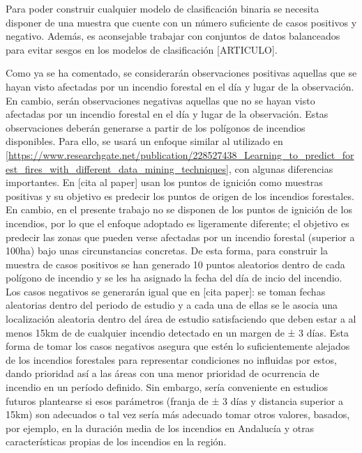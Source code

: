 \documentclass[12pt,a4paper,]{book}
\numberwithin{dummy}{section}
\theoremstyle{ocrenumbox}
\theoremstyle{blacknumex}
\theoremstyle{blacknumbox}
\theoremstyle{ocrenum}
\theoremstyle{ocrenum}
\begin{document}
Para poder construir cualquier modelo de clasificación binaria se
necesita disponer de una muestra que cuente con un número suficiente de
casos positivos y negativo. Además, es aconsejable trabajar con
conjuntos de datos balanceados para evitar sesgos en los modelos de
clasificación {[}ARTICULO{]}.

Como ya se ha comentado, se considerarán observaciones positivas
aquellas que se hayan visto afectadas por un incendio forestal en el día
y lugar de la observación. En cambio, serán observaciones negativas
aquellas que no se hayan visto afectadas por un incendio forestal en el
día y lugar de la observación. Estas observaciones deberán generarse a
partir de los polígonos de incendios disponibles. Para ello, se usará un
enfoque similar al utilizado en
{[}\url{https://www.researchgate.net/publication/228527438_Learning_to_predict_forest_fires_with_different_data_mining_techniques}{]},
con algunas diferencias importantes. En {[}cita al paper{]} usan los
puntos de ignición como muestras positivas y su objetivo es predecir los
puntos de origen de los incendios forestales. En cambio, en el presente
trabajo no se disponen de los puntos de ignición de los incendios, por
lo que el enfoque adoptado es ligeramente diferente; el objetivo es
predecir las zonas que pueden verse afectadas por un incendio forestal
(superior a 100ha) bajo unas circunstancias concretas. De esta forma,
para construir la muestra de casos positivos se han generado 10 puntos
aleatorios dentro de cada polígono de incendio y se les ha asignado la
fecha del día de incio del incendio. Los casos negativos se generarán
igual que en {[}cita paper{]}: se toman fechas aleatorias dentro del
periodo de estudio y a cada una de ellas se le asocia una localización
aleatoria dentro del área de estudio satisfaciendo que deben estar a al
menos 15km de de cualquier incendio detectado en un margen de ± 3 días.
Esta forma de tomar los casos negativos asegura que estén lo
suficientemente alejados de los incendios forestales para representar
condiciones no influidas por estos, dando prioridad así a las áreas con
una menor prioridad de ocurrencia de incendio en un período definido.
Sin embargo, sería conveniente en estudios futuros plantearse si esos
parámetros (franja de ± 3 días y distancia superior a 15km) son
adecuados o tal vez sería más adecuado tomar otros valores, basados, por
ejemplo, en la duración media de los incendios en Andalucía y otras
características propias de los incendios en la región.
\end{document}
